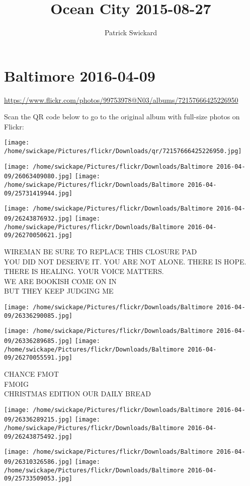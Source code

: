 \documentclass[10pt,letterpaper]{article}
\title{Ocean City 2015-08-27}
\author{Patrick Swickard}
\date{}
\begin{document}
\section*{Baltimore 2016-04-09}

\url{https://www.flickr.com/photos/99753978@N03/albums/72157666425226950}

Scan the QR code below to go to the original album with full-size photos on Flickr:

\texttt{[image: /home/swickape/Pictures/flickr/Downloads/qr/72157666425226950.jpg]}
\pagebreak

\texttt{[image: /home/swickape/Pictures/flickr/Downloads/Baltimore 2016-04-09/26063409080.jpg]}
\texttt{[image: /home/swickape/Pictures/flickr/Downloads/Baltimore 2016-04-09/25731419944.jpg]}

\texttt{[image: /home/swickape/Pictures/flickr/Downloads/Baltimore 2016-04-09/26243876932.jpg]}
\texttt{[image: /home/swickape/Pictures/flickr/Downloads/Baltimore 2016-04-09/26270050621.jpg]}

WIREMAN BE SURE TO REPLACE THIS CLOSURE PAD\\
YOU DID NOT DESERVE IT. YOU ARE NOT ALONE. THERE IS HOPE. THERE IS HEALING. YOUR VOICE MATTERS.\\
WE ARE BOOKISH COME ON IN\\
BUT THEY KEEP JUDGING ME
\pagebreak

\texttt{[image: /home/swickape/Pictures/flickr/Downloads/Baltimore 2016-04-09/26336290085.jpg]}

\vspace{0.25in}
\texttt{[image: /home/swickape/Pictures/flickr/Downloads/Baltimore 2016-04-09/26336289685.jpg]}
\texttt{[image: /home/swickape/Pictures/flickr/Downloads/Baltimore 2016-04-09/26270055591.jpg]}

CHANCE FMOT\\
FMOIG\\
CHRISTMAS EDITION OUR DAILY BREAD
\pagebreak

\texttt{[image: /home/swickape/Pictures/flickr/Downloads/Baltimore 2016-04-09/26336289215.jpg]}
\texttt{[image: /home/swickape/Pictures/flickr/Downloads/Baltimore 2016-04-09/26243875492.jpg]}

\texttt{[image: /home/swickape/Pictures/flickr/Downloads/Baltimore 2016-04-09/26310326586.jpg]}
\texttt{[image: /home/swickape/Pictures/flickr/Downloads/Baltimore 2016-04-09/25733509053.jpg]}
\end{document}
